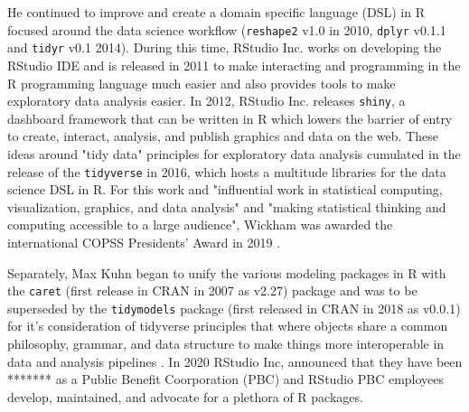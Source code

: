 \documentclass[010-intro.tex]{subfiles}
\begin{document}
        He continued to improve and create a domain specific language (DSL) in R focused around the data science workflow
        (\lstinline{reshape2} v1.0 in 2010, \lstinline{dplyr} v0.1.1 and \lstinline{tidyr} v0.1 2014).
        During this time, RStudio Inc. works on developing the RStudio IDE and is released in 2011 to make interacting and programming
        in the R programming language much easier and also provides tools to make exploratory data analysis easier.
        In 2012, RStudio Inc. releases \lstinline{shiny},
        a dashboard framework that can be written in R which
        lowers the barrier of entry to create, interact, analysis, and publish graphics and data on the web.
        These ideas around "tidy data" principles for exploratory data analysis
        \cite{wickhamTidyData2014}
        cumulated in the release of the \lstinline{tidyverse} in 2016,
        which hosts a multitude libraries for the data science DSL in R.
        For this work and "influential work in statistical computing, visualization, graphics, and data analysis" and
        "making statistical thinking and computing accessible to a large audience",
        Wickham was awarded the international COPSS Presidents' Award in 2019
        \cite{InstituteMathematicalStatistics2019}.

        Separately,
        Max Kuhn began to unify the various modeling packages in R with the \lstinline{caret} (first release in CRAN in 2007 as v2.27) package
        and was to be superseded by
        the \lstinline{tidymodels} package (first released in CRAN in 2018 as v0.0.1)
        for it's consideration of tidyverse principles that where objects share a common philosophy, grammar, and data structure
        to make things more interoperable in data and analysis pipelines
        \cite{wickhamR4ds, kuhnTidyModeling2021}.
        In 2020 RStudio Inc, announced that they have been ******* as a Public Benefit Coorporation (PBC) %
        and RStudio PBC employees develop, maintained, and advocate for a plethora of R packages.
\end{document}
